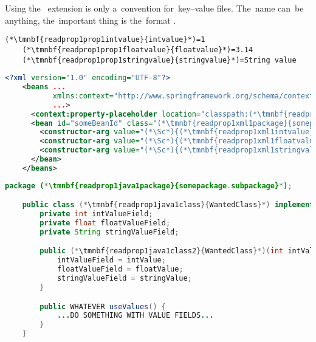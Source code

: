 \note Using the~ extension is only a~convention for~key--value files.
The~name can~be anything, the~important thing is the~format .
\newpage

\begin{lstlisting}[title={A \textit{properties} file called \tmnbf{readprop1prop1filename}{\textit{constructor.properties}}}]
    (*\tmnbf{readprop1prop1intvalue}{intvalue}*)=1
    (*\tmnbf{readprop1prop1floatvalue}{floatvalue}*)=3.14
    (*\tmnbf{readprop1prop1stringvalue}{stringvalue}*)=String value
\end{lstlisting}
\begin{lstlisting}[language=XML, title={Configuration XML}]
    <?xml version="1.0" encoding="UTF-8"?>
    <beans ...
           xmlns:context="http://www.springframework.org/schema/context"
           ...>
      <context:property-placeholder location="classpath:(*\tmnbf{readprop1xml1filename}{constructor.properties}[ForestGreen]*)" file-encoding="utf-8"/>
      <bean id="someBeanId" class="(*\tmnbf{readprop1xml1package}{somepackage.subpackage}[ForestGreen]*).(*\tmnbf{readprop1xml1class}{WantedClass}[ForestGreen]*)">
        <constructor-arg value="(*\Sc*){(*\tmnbf{readprop1xml1intvalue}{intvalue}[ForestGreen]*)}"/>
        <constructor-arg value="(*\Sc*){(*\tmnbf{readprop1xml1floatvalue}{floatvalue}[ForestGreen]*)}"/>
        <constructor-arg value="(*\Sc*){(*\tmnbf{readprop1xml1stringvalue}{stringvalue}[ForestGreen]*)}"/>
      </bean>
    </beans>
\end{lstlisting}
\begin{lstlisting}[language=Java, title={Wanted class with the constructor}]
    package (*\tmnbf{readprop1java1package}{somepackage.subpackage}*);

    public class (*\tmnbf{readprop1java1class}{WantedClass}*) implements WantedInterface {
        private int intValueField;
        private float floatValueField;
        private String stringValueField;

        public (*\tmnbf{readprop1java1class2}{WantedClass}*)(int intValue, float floatValue, String stringValue) {
            intValueField = intValue;
            floatValueField = floatValue;
            stringValueField = stringValue;
        }

        public WHATEVER useValues() {
            ...DO SOMETHING WITH VALUE FIELDS...
        }
    }
\end{lstlisting}
\newpage

